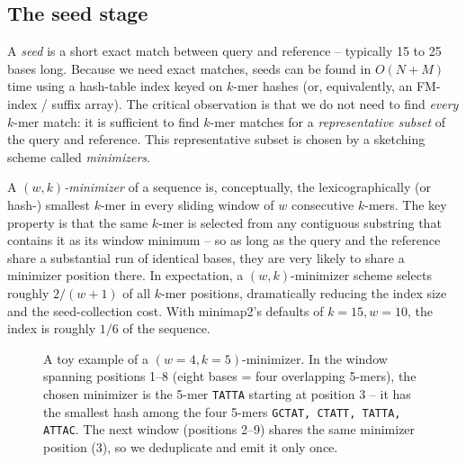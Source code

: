 \subsection{The seed stage}

A \emph{seed} is a short exact match between query and reference --
typically 15 to 25 bases long. Because we need exact matches, seeds
can be found in $O(N + M)$ time using a hash-table index keyed on
$k$-mer hashes (or, equivalently, an FM-index / suffix array). The
critical observation is that we do not need to find \emph{every}
$k$-mer match: it is sufficient to find $k$-mer matches for a
\emph{representative subset} of the query and reference. This
representative subset is chosen by a sketching scheme called
\emph{minimizers}.

A $(w, k)$\emph{-minimizer} of a sequence is, conceptually, the
lexicographically (or hash-) smallest $k$-mer in every sliding window
of $w$ consecutive $k$-mers. The key property is that the same
$k$-mer is selected from any contiguous substring that contains it as
its window minimum -- so as long as the query and the reference share
a substantial run of identical bases, they are very likely to share a
minimizer position there. In expectation, a $(w, k)$-minimizer scheme
selects roughly $2/(w+1)$ of all $k$-mer positions, dramatically
reducing the index size and the seed-collection cost. With minimap2's
defaults of $k = 15, w = 10$, the index is roughly $1/6$ of the
sequence.

\begin{figure}[ht]
  \centering
  \caption{A toy example of a $(w=4, k=5)$-minimizer. In the window
    spanning positions 1--8 (eight bases = four overlapping 5-mers),
    the chosen minimizer is the 5-mer \texttt{TATTA} starting at
    position 3 -- it has the smallest hash among the four 5-mers
    \texttt{GCTAT, CTATT, TATTA, ATTAC}. The next window (positions
    2--9) shares the same minimizer position (3), so we deduplicate
    and emit it only once.}
  \label{fig:minimizer-toy}
\end{figure}


